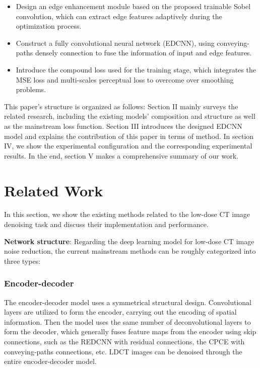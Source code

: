 \documentclass[conference]{IEEEtran}
\begin{document}
        \begin{itemize}
            \item Design an edge enhancement module based on the proposed trainable Sobel convolution, which can extract edge features adaptively during the optimization process.
            \item Construct a fully convolutional neural network (EDCNN), using conveying-paths densely connection to fuse the information of input and edge features.
            \item Introduce the compound loss used for the training stage, which integrates the MSE loss and multi-scales perceptual loss to overcome over smoothing problems.
        \end{itemize}

        This paper's structure is organized as follows: 
        Section II mainly surveys the related research, including the existing models' composition and structure as well as the mainstream loss function. 
        Section III introduces the designed EDCNN model and explains the contribution of this paper in terms of method. 
        In section IV, we show the experimental configuration and the corresponding experimental results. 
        In the end, section V makes a comprehensive summary of our work.

    \section{Related Work}
        In this section, we show the existing methods related to the low-dose CT image denoising task and discuss their implementation and performance.

        \medskip

        \textbf{Network structure}: Regarding the deep learning model for low-dose CT image noise reduction, the current mainstream methods can be roughly categorized into three types: 

        \smallskip

        \subsubsection{Encoder-decoder}
            The encoder-decoder model uses a symmetrical structural design. 
            Convolutional layers are utilized to form the encoder, carrying out the encoding of spatial information. 
            Then the model uses the same number of deconvolutional layers to form the decoder, which generally fuses feature maps from the encoder using skip connections, such as the REDCNN\cite{Chen_2017} with residual connections, the CPCE\cite{Shan_2018} with conveying-paths connections, etc.
            LDCT images can be denoised through the entire encoder-decoder model.
\end{document}
